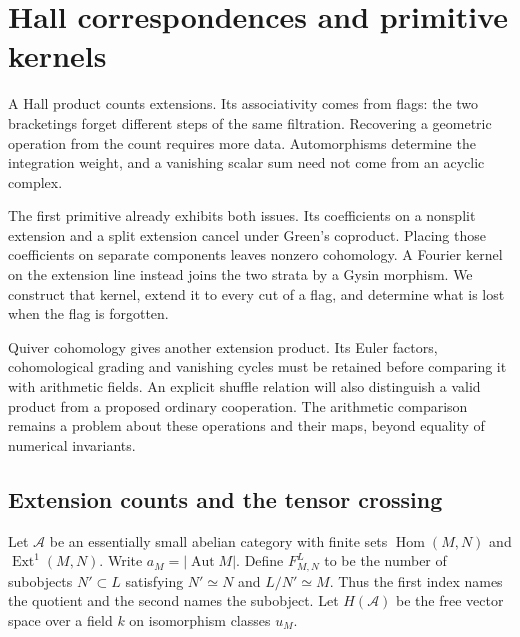 \chapter{Hall correspondences and primitive kernels}
\label{v4-arith:hall:chapter}

A Hall product counts extensions. Its associativity comes from flags:
the two bracketings forget different steps of the same filtration.
Recovering a geometric operation from the count requires more data.
Automorphisms determine the integration weight, and a vanishing scalar
sum need not come from an acyclic complex.

The first primitive already exhibits both issues. Its coefficients on
a nonsplit extension and a split extension cancel under Green's
coproduct. Placing those coefficients on separate components leaves
nonzero cohomology. A Fourier kernel on the extension line instead
joins the two strata by a Gysin morphism. We construct that kernel,
extend it to every cut of a flag, and determine what is lost when the
flag is forgotten.

Quiver cohomology gives another extension product. Its Euler factors,
cohomological grading and vanishing cycles must be retained before
comparing it with arithmetic fields. An explicit shuffle relation
will also distinguish a valid product from a proposed ordinary
cooperation. The arithmetic comparison remains a problem about these
operations and their maps, beyond equality of numerical invariants.

\section{Extension counts and the tensor crossing}
\label{v4-arith:hall:sec:counts}

Let $\mathcal A$ be an essentially small abelian category with finite
sets $\operatorname{Hom}(M,N)$ and $\operatorname{Ext}^1(M,N)$.
Write $a_M=|\operatorname{Aut}M|$. Define $F^L_{M,N}$ to be the
number of subobjects $N'\subset L$ satisfying
$N'\simeq N$ and $L/N'\simeq M$. Thus the first index names the
quotient and the second names the subobject. Let $H(\mathcal A)$
be the free vector space over a field $k$ on isomorphism classes $u_M$.

